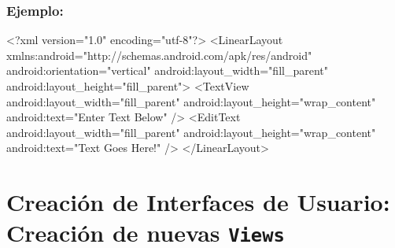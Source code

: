 \documentclass[hyperref={pdfpagelabels=true},ucs]{beamer}
\begin{document}
\begin{frame}[fragile]
\frametitle{Ejemplo:}

\begin{tiny}
\begin{block}{}
\begin{xml}
<?xml version="1.0" encoding="utf-8"?>
<LinearLayout xmlns:android="http://schemas.android.com/apk/res/android"
  android:orientation="vertical"
  android:layout_width="fill_parent"
  android:layout_height="fill_parent">
  <TextView
     android:layout_width="fill_parent"
     android:layout_height="wrap_content"
     android:text="Enter Text Below"
  />
  <EditText
     android:layout_width="fill_parent"
     android:layout_height="wrap_content"
     android:text="Text Goes Here!"
  />
</LinearLayout>
\end{xml}
\end{block}
\end{tiny}


\end{frame}



\section{Creación de Interfaces de Usuario: Creación de nuevas \texttt{Views}}
\end{document}
